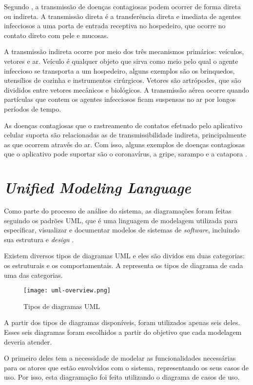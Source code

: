 Segundo \textcite{Duncan2013}, a transmissão de doenças contagiosas podem ocorrer de forma direta ou indireta. A transmissão direta é a transferência direta e imediata de agentes infecciosos a uma porta de entrada receptiva no hospedeiro, que ocorre no contato direto com pele e mucosas. 

A transmissão indireta ocorre por meio dos três mecanismos primários: veículos, vetores e ar. Veículo é qualquer objeto que sirva como meio pelo qual o agente infeccioso se transporta a um hospedeiro, alguns exemplos são os brinquedos, utensílios de cozinha e instrumentos cirúrgicos. Vetores são artrópodes, que são divididos entre vetores mecânicos e biológicos. A transmissão aérea ocorre quando partículas que contem os agentes infecciosos ficam suspensas no ar por longos períodos de tempo.

As doenças contagiosas que o rastreamento de contatos efetuado pelo aplicativo celular suporta são relacionadas as de transmissibilidade indireta, principalmente as que ocorrem através do ar. Com isso, alguns exemplos de doenças contagiosas que o aplicativo pode suportar são o coronavírus, a gripe, sarampo e a catapora \cite{Descomplica}.

\section{\textit{Unified Modeling Language}}\label{sec:uml}
Como parte do processo de análise do sistema, as diagramações foram feitas seguindo os padrões UML, que é uma linguagem de modelagem utilizada para especificar, visualizar e documentar modelos de sistemas de \textit{software}, incluindo sua estrutura e \textit{design} \cite{uml}.

Existem diversos tipos de diagramas UML e eles são dividos em duas categorias: os estruturais e os comportamentais. A  representa os tipos de diagrama de cada uma das categorias.

\begin{figure}[!htb]
    \centering
    \texttt{[image: uml-overview.png]}
    \caption{Tipos de diagramas UML}
    \label{fig:umloverview}
\end{figure}

A partir dos tipos de diagramas disponíveis, foram utilizados apenas seis deles. Esses seis diagramas foram escolhidos a partir do objetivo que cada modelagem deveria atender. 

O primeiro deles tem a necessidade de modelar as funcionalidades necessárias para os atores que estão envolvidos com o sistema, representando os seus casos de uso. Por isso, esta diagramação foi feita utilizando o diagrama de casos de uso.


